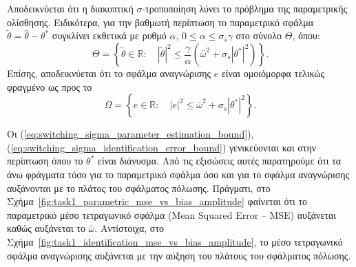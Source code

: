 \documentclass[a4paper,12pt]{article}
\begin{document}
Αποδεικνύεται ότι η διακοπτική $\sigma$-τροποποίηση λύνει το πρόβλημα της παραμετρικής ολίσθησης. 
Ειδικότερα, για την βαθμωτή περίπτωση το παραμετρικό σφάλμα $\tilde{\theta} = \hat{\theta} - \theta^*$ 
συγκλίνει εκθετικά με ρυθμό 
$\alpha, \,0 \leq \alpha \leq \sigma_s \gamma $ στο σύνολο $\Theta$, όπου:
\begin{equation}
    \Theta = \left\{ \tilde{\theta} \in \mathbb{R}: \quad |\tilde{\theta}|^2 \leq 
    \frac{\gamma}{\alpha}\left(\bar{\omega}^2 + \sigma_s |\theta^*|^2\right)\right\}.
    \label{eq:switching_sigma_parameter_estimation_bound}
\end{equation}
Επίσης, αποδεικνύεται ότι το σφάλμα αναγνώρισης $e$ είναι ομοιόμορφα τελικώς φραγμένο ως προς το
\begin{equation}
    \Omega = \left\{e \in \mathbb{R}: \quad |e|^2 \leq \bar{\omega}^2 + \sigma_s |\theta^*|^2\right\}.
    \label{eq:switching_sigma_identification_error_bound}
\end{equation}

Οι (\ref{eq:switching_sigma_parameter_estimation_bound}), 
(\ref{eq:switching_sigma_identification_error_bound}) γενικεύονται και στην περίπτωση όπου το $\theta^*$ 
είναι διάνυσμα. Από τις εξισώσεις αυτές παρατηρούμε ότι τα άνω φράγματα τόσο για το παραμετρικό σφάλμα όσο 
και για το σφάλμα αναγνώρισης αυξάνονται με το πλάτος του σφάλματος πόλωσης. Πράγματι, 
στο Σχήμα~\ref{fig:task1_parametric_mse_vs_bias_amplitude} φαίνεται ότι το παραμετρικό μέσο τετραγωνικό 
σφάλμα (Mean Squared Error -- MSE) αυξάνεται καθώς αυξάνεται το 
$\bar{\omega}$. Αντίστοιχα, στο Σχήμα~\ref{fig:task1_identification_mse_vs_bias_amplitude}, το μέσο 
τετραγωνικό σφάλμα αναγνώρισης αυξάνεται με την αύξηση του πλάτους του σφάλματος πόλωσης.
\end{document}
